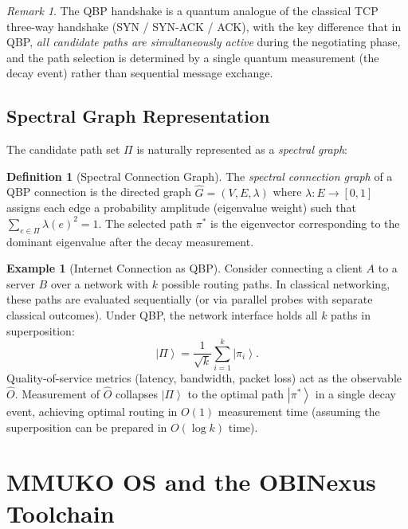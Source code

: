 \documentclass[11pt]{article}
\theoremstyle{plain}
\theoremstyle{definition}
\newtheorem{definition}[theorem]{Definition}
\newtheorem{example}[theorem]{Example}
\theoremstyle{remark}
\newtheorem{remark}[theorem]{Remark}
\newcommand{\ket}[1]{\left| #1 \right\rangle}
\begin{document}
\begin{remark}
  The QBP handshake is a quantum analogue of the classical TCP three-way
  handshake (SYN / SYN-ACK / ACK), with the key difference that in QBP,
  \emph{all candidate paths are simultaneously active} during the negotiating
  phase, and the path selection is determined by a single quantum measurement
  (the decay event) rather than sequential message exchange.
\end{remark}

\subsection{Spectral Graph Representation}

The candidate path set $\Pi$ is naturally represented as a \emph{spectral
graph}:

\begin{definition}[Spectral Connection Graph]
  The \emph{spectral connection graph} of a QBP connection is the directed
  graph $\hat{G} = (V, E, \lambda)$ where $\lambda : E \to [0,1]$ assigns
  each edge a probability amplitude (eigenvalue weight) such that
  $\sum_{e \in \Pi} \lambda(e)^2 = 1$.  The selected path $\pi^*$ is the
  eigenvector corresponding to the dominant eigenvalue after the decay
  measurement.
\end{definition}

\begin{example}[Internet Connection as QBP]
  Consider connecting a client $A$ to a server $B$ over a network with $k$
  possible routing paths.  In classical networking, these paths are
  evaluated sequentially (or via parallel probes with separate classical
  outcomes).  Under QBP, the network interface holds all $k$ paths in
  superposition:
  \[
    \ket{\Pi} = \frac{1}{\sqrt{k}} \sum_{i=1}^k \ket{\pi_i}.
  \]
  Quality-of-service metrics (latency, bandwidth, packet loss) act as the
  observable $\hat{O}$.  Measurement of $\hat{O}$ collapses $\ket{\Pi}$ to
  the optimal path $\ket{\pi^*}$ in a single decay event, achieving optimal
  routing in $O(1)$ measurement time (assuming the superposition can be
  prepared in $O(\log k)$ time).
\end{example}

\section{MMUKO OS and the OBINexus Toolchain}
\label{sec:mmuko}
\end{document}
